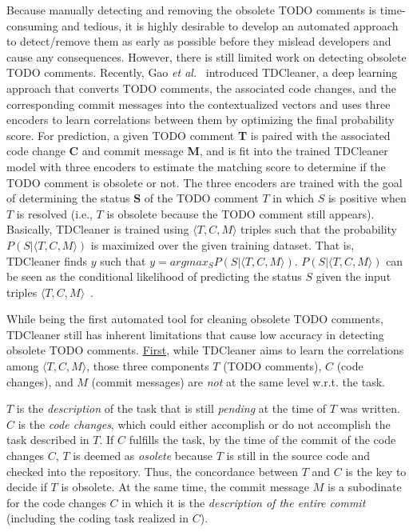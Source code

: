 Because manually detecting and removing the obsolete TODO comments is
time-consuming and tedious, it is highly desirable to develop an
automated approach to detect/remove them as early as possible before
they mislead developers and cause any consequences. However, there is
still limited work on detecting obsolete TODO comments. Recently, Gao
{\em et al.}~\cite{tdcleaner-fse21} introduced TDCleaner, a deep
learning approach that converts TODO comments, the associated code
changes, and the corresponding commit messages into the contextualized
vectors and uses three encoders to learn correlations between them by
optimizing the final probability score. For prediction, a given TODO
comment {\bf T} is paired with the associated code change {\bf C} and
commit message {\bf M}, and is fit into the trained TDCleaner model
with three encoders to estimate the matching score to determine if the
TODO comment is obsolete or not. The three encoders are trained with
the goal of determining the status {\bf S} of the TODO comment $T$ in
which $S$ is positive when $T$ is resolved (i.e., $T$ is obsolete
because the TODO comment still appears). Basically, TDCleaner is
trained using $\langle T, C, M \rangle$ triples such that the
probability $P(S | \langle T, C, M \rangle)$ is maximized over the
given training dataset. That is, TDCleaner finds $y$ such that $y =
argmax_S P (S | \langle T, C, M \rangle)$. $P(S | \langle T, C, M
\rangle)$ can be seen as the conditional likelihood of predicting the
status $S$ given the input triples $\langle T, C, M
\rangle$~\cite{tdcleaner-fse21}.

While being the first automated tool for cleaning obsolete TODO
comments, TDCleaner still has inherent limitations that cause low
accuracy in detecting obsolete TODO comments. \underline{First}, while
TDCleaner aims to learn the correlations among $\langle T, C, M
\rangle$, those three components $T$ (TODO comments), $C$ (code
changes), and $M$ (commit messages) are {\em not} at the same level
w.r.t. the task.

$T$ is the {\em description} of the task that is still {\em pending}
at the time of $T$ was written. $C$ is the {\em code changes}, which
could either accomplish or do not accomplish the task described in
$T$. If $C$ fulfills the task, by the time of the commit of the code
changes $C$, $T$ is deemed as {\em osolete} because $T$ is still in
the source code and checked into the repository. Thus, the concordance
between $T$ and $C$ is the key to decide if $T$ is obsolete. At the
same time, the commit message $M$ is a subodinate for the code changes
$C$ in which it is the {\em description of the entire commit}
(including the coding task realized in $C$).
